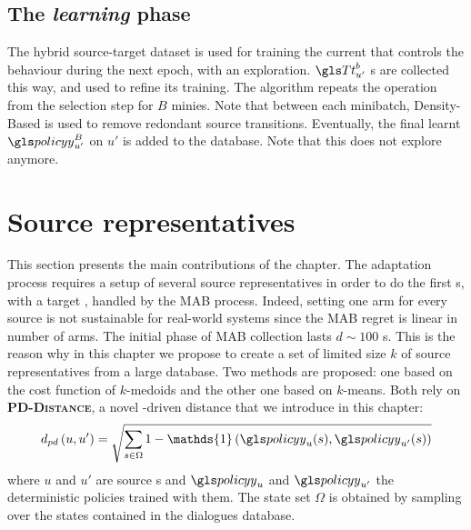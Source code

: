 \subsection{The \textit{learning} phase}

The hybrid source-target dataset is used for training the current  that controls the behaviour during the next epoch, with an  exploration. $\T^b_{u'}$ s are collected this way, and used to refine its training. The algorithm repeats the operation from the  selection step for $B$ minies. Note that between each minibatch, Density-Based is used to remove redondant source transitions. Eventually, the final learnt  $\policy^B_{u'}$ on $u'$ is added to the database. Note that this  does not explore anymore.


\section{Source representatives}
\label{sec:systemsrepresentatives}

This section presents the main contributions of the chapter. The adaptation process requires a setup of several source representatives in order to do the first s, with a target , handled by the \gls{MAB} process. Indeed, setting one arm for every source  is not sustainable for real-world systems since the  \gls{MAB} regret is linear in number of arms. The initial phase of \gls{MAB}  collection lasts $d \sim 100$ s. This is the reason why in this chapter we propose to create a set of limited size $k$ of source representatives from a large  database.
Two methods are proposed: one based on the cost function of $k$-medoids and the other one based on $k$-means.
Both rely on \textbf{\textsc{PD-Distance}}, a novel -driven distance that we introduce in this chapter:
\begin{equation}
    d_{pd}\left(u,u'\right) = \sqrt{\sum_{s\in\Omega}1 - \mathds{1}\left(\policy_{u}(s),\policy_{u'}(s)\right)}
\end{equation}
where $u$ and $u'$ are source s and $\policy_{u}$ and $\policy_{u'}$ the deterministic policies trained with them. The state set $\Omega$ is obtained by sampling over the states contained in the dialogues database.

